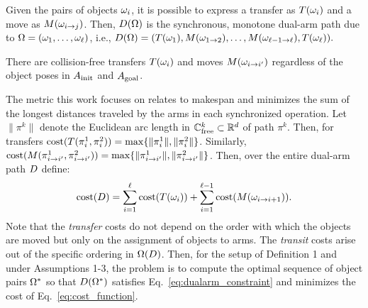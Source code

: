 \noindent Given the pairs of objects ${\omega}_i$, it is possible to express a transfer as $T({\omega}_i)$ and a move as $M({\omega}_{i\rightarrow j})$.  Then, $D({{\Omega}})$ is the synchronous, monotone dual-arm path due to ${{\Omega}} = ({\omega}_1, \ldots, {\omega}_{\ell})$, i.e., $D({{\Omega}}) = (T({\omega}_1),M({\omega}_{1\rightarrow 2}),\ldots,M({\omega}_{\ell-1\rightarrow \ell}),T({\omega}_\ell)).$

{ There are collision-free transfers $T({\omega}_i)$ and moves $M({\omega}_{i\rightarrow i^{\prime}})$ regardless of the object poses in $A_{\rm init}$ and $A_{\rm goal}$.}

The metric this work focuses on relates to makespan and minimizes the sum of the longest distances traveled by the arms in each synchronized operation. Let $ \| \pi^k \| $ denote the Euclidean arc length in $\mathbb{C}_{{\rm free}}^k  \subset \mathbb{R}^d$ of path $ \pi^k $. Then, for transfers $\textup{cost}( T(\pi^1_i,\pi^2_i) ) = \max\{ \|\pi^1_i\|, \|\pi^2_i\| \}$. Similarly, $\textup{cost}( M(\pi^1_{i\rightarrow i^{\prime}},\pi^2_{i\rightarrow i^{\prime}}) ) = \max\{ \|\pi^1_{i\rightarrow i'}\|, \|\pi^2_{i\rightarrow i'}\| \}$. Then, over the entire dual-arm path $ D $ define:
\begin{equation}
\cost(\D) 
= \sum_{i=1}^{\ell}   \cost(T(\coma_i))   + \sum_{i=1}^{\ell-1}   \cost(M(\coma_{i\rightarrow i+1})). 
\label{eq:cost_function}
\end{equation}
Note that the \textit{transfer} costs do not depend on the order with which the objects are moved but only on the assignment of objects to arms. The \textit{transit} costs arise out of the specific ordering in $ {{\Omega}}(D)$. 
Then, for the setup of Definition 1 and under Assumptions 1-3, the problem is to compute the optimal sequence of object pairs ${{\Omega}}^*$ so that $D({{\Omega}}^*)$ satisfies Eq.~\ref{eq:dualarm_constraint} and minimizes the cost of Eq.~\ref{eq:cost_function}.

